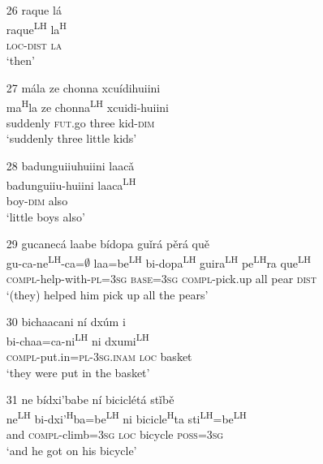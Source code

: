 \begin{itemize}
\item[26]
\glll raque l\'{a}\\
raque\textsuperscript{LH} la\textsuperscript{H} \\
\textsc{loc}-\textsc{dist} \textsc{la}  \\
\glt `then'


\item[27]
\glll m\'{a}la ze chonna xcu\'{i}dihuiini\\
ma\textsuperscript{H}la ze chonna\textsuperscript{LH} xcuidi-huiini\\
suddenly \textsc{fut}.go three kid-\textsc{dim}\\
\glt `suddenly three little kids'


\item[28]
\glll badunguiiuhuiini laac\v{a}\\
badunguiiu-huiini laaca\textsuperscript{LH}\\
boy-\textsc{dim} also\\
\glt `little boys also'


\item[29]
\glll gucanec\'{a} laabe b\'{i}dopa gu\v{i}r\'{a} p\v{e}r\'{a} qu\v{e}\\
gu-ca-ne\textsuperscript{LH}-ca=$\emptyset$ laa=be\textsuperscript{LH} bi-dopa\textsuperscript{LH} guira\textsuperscript{LH} pe\textsuperscript{LH}ra que\textsuperscript{LH}\\
\textsc{compl}-help-with-\textsc{pl}=\textsc{3sg} \textsc{base}=\textsc{3sg} \textsc{compl}-pick.up all pear \textsc{dist}\\
\glt `(they) helped him pick up all the pears'
 

\item[30]
\glll bichaacani n\'{i} dx\'{u}m\v{ i}\\
bi-chaa=ca-ni\textsuperscript{LH} ni dxumi\textsuperscript{LH}\\
\textsc{compl}-put.in=\textsc{pl}-\textsc{3sg.inam} \textsc{loc} basket\\
\glt `they were put in the basket'
 

\item[31]
\glll ne b\'{i}dxi'babe n\'{i} bicicl\'{e}t\'{a} st\v{i}b\v{e}\\
ne\textsuperscript{LH} bi-dxi'\textsuperscript{H}ba=be\textsuperscript{LH} ni bicicle\textsuperscript{H}ta sti\textsuperscript{LH}=be\textsuperscript{LH}\\
and \textsc{compl}-climb=\textsc{3sg} \textsc{loc} bicycle \textsc{poss}=\textsc{3sg}\\
\glt `and he got on his bicycle'



\end{itemize}

